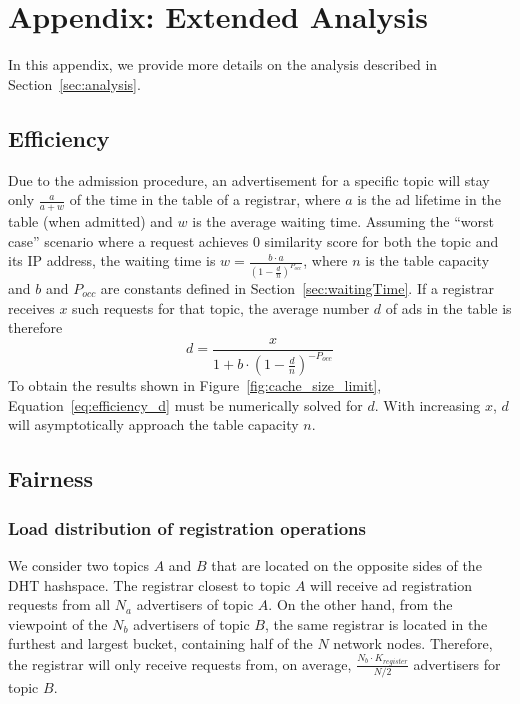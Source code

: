 
\newpage
\appendix
\section*{Appendix: Extended Analysis}
\label{sec:appendix}

In this appendix, we provide more details on the analysis described in Section~\ref{sec:analysis}.

\subsection{Efficiency}

Due to the admission procedure, an advertisement for a specific topic will stay only $\frac{a}{a+w}$ of the time in the table of a registrar, where $a$ is the ad lifetime in the table (when admitted) and $w$ is the average waiting time. Assuming the ``worst case'' scenario where a request achieves 0 similarity score for both the topic and its IP address, the waiting time is $w = \frac{b\cdot a}{(1 - \frac{d}{n})^{P_\textit{occ}}}$, where $n$ is the table capacity and $b$ and $P_{occ}$ are constants defined in Section~\ref{sec:waitingTime}.
If a registrar receives $x$ such requests for that topic, the average number $d$ of ads in the table is therefore
\begin{equation}
d = \frac{x}{1 + b \cdot (1 - \frac{d}{n})^{-P_\textit{occ}}} \label{eq:efficiency_d}
\end{equation}
To obtain the results shown in Figure~\ref{fig:cache_size_limit}, Equation~\ref{eq:efficiency_d} must be numerically solved for $d$. With increasing $x$, $d$ will asymptotically approach the table capacity $n$.

\subsection{Fairness}

\subsubsection{Load distribution of registration operations}

We consider two topics $A$ and $B$ that are located on the opposite sides of the DHT hashspace. The registrar closest to topic $A$ will receive ad registration requests from all $N_a$ advertisers of topic $A$. On the other hand, from the viewpoint of the $N_b$ advertisers of topic $B$, the same registrar is located in the furthest  and largest bucket, containing half of the $N$ network nodes. Therefore, the registrar will only receive requests from, on average, $\frac{N_b\cdot K_\textit{register}}{N/2}$ advertisers for topic $B$.


